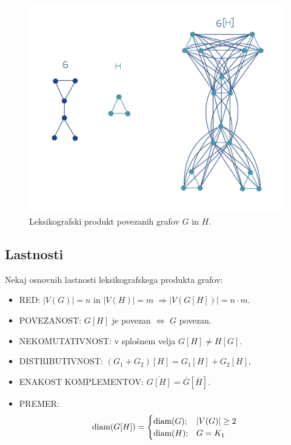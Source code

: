 \documentclass[mat1, tisk]{fmfdelo}
\newcommand{\1}{(1, 1, \ldots, 1)}
\newcommand{\2}{(2, 2, \ldots, 2)}
\begin{document}
\begin{figure}[h]
    \centering
    \includegraphics[width=\textwidth]{IMG_produkt.jpg}   
    \caption{Leksikografski produkt povezanih grafov $G$ in $H$.}   
    \label{fig:produkt}
\end{figure}




\subsection{Lastnosti} \label{ss:lastnosti_leks_prod}
Nekaj osnovnih lastnosti leksikografskega produkta grafov:
\begin{itemize}
    \item RED: $|V(G)| = n$ in $|V(H)| = m \; \Rightarrow |V(G[H])| = n \cdot m.$
    \item POVEZANOST: $G[H]$ je povezan $\Leftrightarrow$ $G$ povezan. 
    \item NEKOMUTATIVNOST: v splošnem velja $G[H] \neq H[G].$
    \item DISTRIBUTIVNOST: $(G_1 + G_2)[H] = G_1[H] + G_2[H],$ 
    \item ENAKOST KOMPLEMENTOV: $\overline{G[H]} = \overline{G} [\overline{H}].$
    \item PREMER: $$ {\rm diam}(G[H]) =  \begin{cases} 
        {\rm diam}(G); & |V(G)| \geq 2 \\
        {\rm diam}(H); & G = K_1
        \end{cases}$$

\end{itemize}
\end{document}
